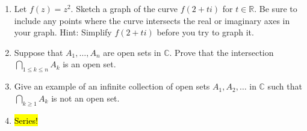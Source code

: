 \documentclass[11pt]{article}
\newcommand{\R}{\mathbb{R}}
\newcommand{\C}{\mathbb{C}}
\begin{document}
\begin{enumerate}
\newpage
\item Let $f(z) = z^2$.  Sketch a graph of the curve $f(2+ti)$ for $t \in \R$. Be sure to include any points where the curve intersects the real or imaginary axes in your graph. Hint: Simplify $f(2+ti)$ before you try to graph it. 
\vfill



\item Suppose that $A_1, \ldots, A_n$ are open sets in $\C$.  Prove that the intersection $\bigcap_{1 \le k \le n} A_k$ is an open set.  
\vfill

\item Give an example of an infinite collection of open sets $A_1, A_2, \ldots$ in $\C$ such that $\bigcap_{k \ge 1} A_k$ is not an open set. 
\vfill 

\item \hl{Series!}
\vfill
 
\end{enumerate}
\end{document}
